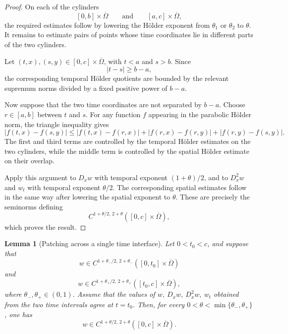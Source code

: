 \documentclass[11pt]{article}
\newtheorem{lemma}[theorem]{Lemma}
\theoremstyle{remark}
\begin{document}
\begin{proof}
On each of the cylinders
\[
[0,b]\times\overline{\Omega}
\qquad\text{and}\qquad
[a,c]\times\overline{\Omega},
\]
the required estimates follow by lowering the H\"older exponent from
$\theta_1$ or $\theta_2$ to $\theta$. It remains to estimate pairs of
points whose time coordinates lie in different parts of the two
cylinders.

Let $(t,x),(s,y)\in[0,c]\times\overline{\Omega}$, with
$t<a$ and $s>b$. Since
\[
|t-s|\geq b-a,
\]
the corresponding temporal H\"older quotients are bounded by the relevant
supremum norms divided by a fixed positive power of $b-a$.

Now suppose that the two time coordinates are not separated by $b-a$.
Choose $r\in[a,b]$ between $t$ and $s$. For any function $f$ appearing
in the parabolic H\"older norm, the triangle inequality gives
\[
|f(t,x)-f(s,y)|
\leq
|f(t,x)-f(r,x)|
+
|f(r,x)-f(r,y)|
+
|f(r,y)-f(s,y)|.
\]
The first and third terms are controlled by the temporal H\"older
estimates on the two cylinders, while the middle term is controlled by
the spatial H\"older estimate on their overlap.

Apply this argument to $D_xw$ with temporal exponent
$(1+\theta)/2$, and to $D_x^2w$ and $w_t$ with temporal exponent
$\theta/2$. The corresponding spatial estimates follow in the same way
after lowering the spatial exponent to $\theta$. These are precisely the
seminorms defining
\[
C^{1+\theta/2,\,2+\theta}
([0,c]\times\overline{\Omega}),
\]
which proves the result.
\end{proof}

\begin{lemma}[Patching across a single time interface]
\label{lem:interface-patching}
Let $0<t_0<c$, and suppose that
\[
w\in
C^{1+\theta_-/2,\,2+\theta_-}
([0,t_0]\times\overline{\Omega})
\]
and
\[
w\in
C^{1+\theta_+/2,\,2+\theta_+}
([t_0,c]\times\overline{\Omega}),
\]
where $\theta_-,\theta_+\in(0,1)$. Assume that the values of
$w,\ D_xw,\ D_x^2w,\ w_t$
obtained from the two time intervals agree at $t=t_0$. Then, for every
$0<\theta<\min\{\theta_-,\theta_+\}$,
one has
\[
w\in
C^{1+\theta/2,\,2+\theta}
([0,c]\times\overline{\Omega}).
\]
\end{lemma}
\end{document}
